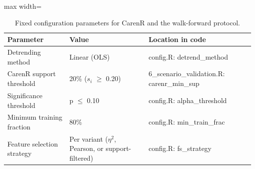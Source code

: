 \begin{table}[htbp]
  \centering
  \caption{Fixed configuration parameters for CarenR and the walk-forward protocol.}\label{tab:ch3d_7}
  \small
  \begin{adjustbox}{max width=\textwidth}
    \begin{tabularx}{\textwidth}{l|l|X}
  \toprule
  Parameter & Value & Location in code \\
  \midrule
  Detrending method & Linear (OLS) & config.R: detrend\_method \\
  CarenR support threshold & 20\% ($s_i$ $\geq$ 0.20) & 6\_scenario\_validation.R: carenr\_min\_sup \\
  Significance threshold & p $\leq$ 0.10 & config.R: alpha\_threshold \\
  Minimum training fraction & 80\% & config.R: min\_train\_frac \\
  Feature selection strategy & Per variant ($\eta$$^2$, Pearson, or support-filtered) & config.R: fs\_strategy \\
  \bottomrule
\end{tabularx}
  \end{adjustbox}
\end{table}
